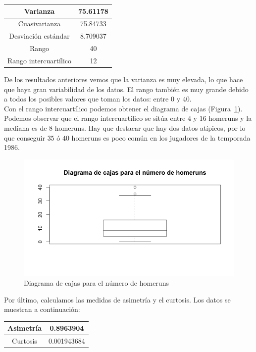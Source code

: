 \documentclass[12pt,a4paper,twoside,openright,titlepage,final]{article}
\begin{document}
\begin{table}[htbp]
\centering
\begin{tabular}{|c|c|}
\hline Varianza & 75.61178 \\ 
\hline Cuasivarianza & 75.84733 \\
\hline Desviación estándar & 8.709037 \\  
\hline Rango & 40  \\ 
\hline Rango intercuartílico & 12  \\ 
\hline 
\end{tabular} 
\end{table}

De los resultados anteriores vemos que la varianza es muy elevada, lo que hace que haya gran variabilidad de los datos. El rango también es muy grande debido a todos los posibles valores que toman los datos: entre $0$ y $40$.\\

Con el rango intercuartílico podemos obtener el diagrama de cajas (Figura~\ref{fig:diagrama_cajas_homeruns}). Podemos observar que el rango intercuartílico se sitúa entre $4$ y $16$ homeruns y la mediana es de $8$ homeruns. Hay que destacar que hay dos datos atípicos, por lo que conseguir $35$ ó $40$ homeruns es poco común en los jugadores de la temporada 1986.\\

\begin{figure}[tbph!]
\centering
\includegraphics[width=0.8\linewidth]{imagenes/diagrama_cajas_homeruns}
\caption{Diagrama de cajas para el número de homeruns}
\label{fig:diagrama_cajas_homeruns}
\end{figure}

Por último, calculamos las medidas de asimetría y el curtosis. Los datos se muestran a continuación:

\begin{table}[htbp]
\centering
\begin{tabular}{|c|c|}
\hline Asimetría & 0.8963904 \\ 
\hline Curtosis & 0.001943684 \\
\hline 
\end{tabular} 
\end{table}
\end{document}
